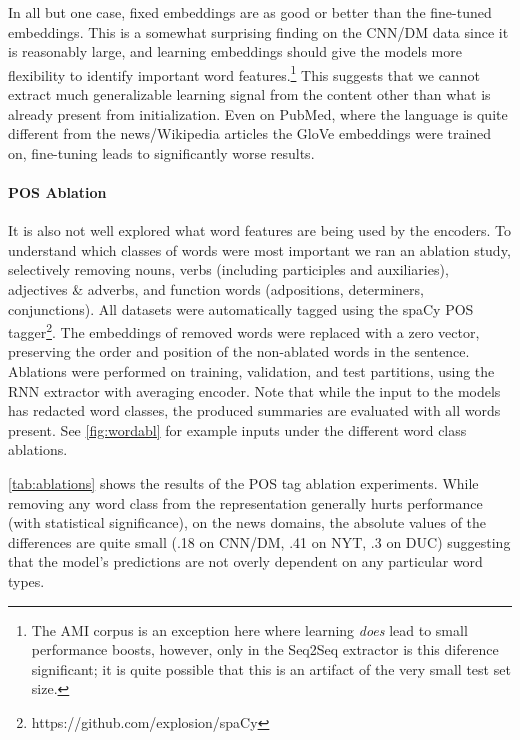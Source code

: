 In all but one case, fixed embeddings are as good or better than the fine-tuned
embeddings.  This is a somewhat surprising finding on the CNN/DM data since it
is reasonably large, and learning embeddings should give the models more
flexibility to identify important word features.\footnote{The AMI corpus is an
exception here where learning \emph{does} lead to small performance boosts,
however, only in the Seq2Seq extractor is this diference significant; it is
quite possible that this is an artifact of the very small test set size.} This
suggests that we cannot extract much generalizable learning signal from the
content other than what is already present from initialization.  Even on
PubMed, where the language is quite different from the news/Wikipedia articles
the GloVe embeddings were trained on, fine-tuning leads to significantly worse
results.



\paragraph{POS Ablation} It is also not well explored what word features are
being used by the encoders.  To understand which classes of words were most
important we ran an ablation study, selectively removing nouns, verbs
(including participles and auxiliaries), adjectives \& adverbs, and function
words (adpositions, determiners, conjunctions).  All datasets were
automatically tagged using the spaCy POS
tagger\footnote{https://github.com/explosion/spaCy}.   The embeddings of
removed words were replaced with a zero vector, preserving the order and
position of the non-ablated words in the sentence.  Ablations were performed on
training, validation, and test partitions, using the RNN extractor with
averaging encoder.  Note that while the input to the models has redacted word
classes, the produced summaries are evaluated with all words present. See
\autoref{fig:wordabl} for example inputs under the different word class
ablations.



\autoref{tab:ablations} shows the results of the POS tag ablation experiments.
While removing any word class from the representation generally hurts
performance (with statistical significance), on the news domains, the absolute
values of the differences are quite small (.18 on CNN/DM, .41 on NYT, .3 on
DUC) suggesting that the model's predictions are not overly dependent on any
particular word types. 

